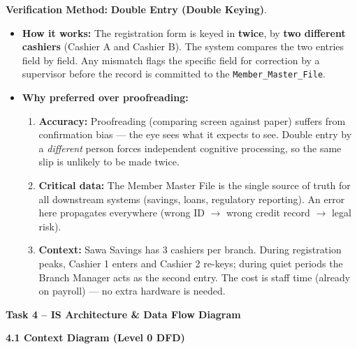\documentclass[11pt]{article}
\newcommand{\cle}[1]{{\popxbold\color{popdark}#1}}
\begin{document}
\medskip
\noindent\textbf{Verification Method:} \textbf{Double Entry (Double Keying)}.
\begin{itemize}
    \item \textbf{How it works:} The registration form is keyed in \textbf{twice}, by \textbf{two different cashiers} (Cashier A and Cashier B). The system compares the two entries field by field. Any mismatch flags the specific field for correction by a supervisor before the record is committed to the \texttt{Member\_Master\_File}.
    \item \textbf{Why preferred over proofreading:}
    \begin{enumerate}
        \item \textbf{Accuracy:} Proofreading (comparing screen against paper) suffers from confirmation bias --- the eye sees what it expects to see. Double entry by a \emph{different} person forces independent cognitive processing, so the same slip is unlikely to be made twice.
        \item \textbf{Critical data:} The Member Master File is the \cle{single source of truth} for all downstream systems (savings, loans, regulatory reporting). An error here propagates everywhere (wrong ID $\rightarrow$ wrong credit record $\rightarrow$ legal risk).
        \item \textbf{Context:} Sawa Savings has 3 cashiers per branch. During registration peaks, Cashier 1 enters and Cashier 2 re-keys; during quiet periods the Branch Manager acts as the second entry. The cost is staff time (already on payroll) --- no extra hardware is needed.
    \end{enumerate}
\end{itemize}

\medskip
\noindent\textbf{Task 4 -- IS Architecture \& Data Flow Diagram}

\medskip
\noindent\textbf{4.1 Context Diagram (Level 0 DFD)}
\end{document}
